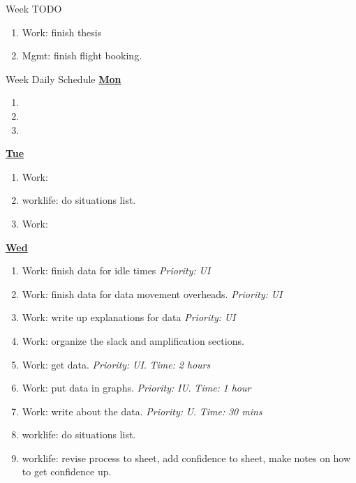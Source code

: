 \documentclass[serif, mathserif, final]{beamer}
\newcommand{\timeEst}[1]{\textit{Time:} \textit{#1}}
\newcommand{\priority}[1]{\textit{Priority:} \textit{#1}}
\begin{document}
\begin{frame}{}
\begin{columns}
\begin{column}{0.50\linewidth}
  
  \begin{block}{Week TODO} 
    \begin{enumerate} 
    \item Work: finish thesis 
    \item Mgmt: finish flight booking. 
    \end{enumerate}
  \end{block} 
  
  
\begin{block}{Week Daily Schedule} 
  \textbf{\small \underline{Mon}}
  \begin{enumerate} 
    \tiny \item \tiny 
  \item \tiny 
  \item \tiny 
  \end{enumerate} 



  \textbf{\small \underline{Tue}}
  \begin{enumerate}
  \item \tiny Work: 
  \item \tiny worklife: do situations list. 
  \item \tiny Work: 
  \end{enumerate} 
  
  \textbf{\small {\underline{Wed}}}
  \begin{enumerate} 
    \tiny \item \tiny Work: finish data for idle times \priority{UI} 
  \item \tiny Work: finish data for data movement overheads. \priority{UI} 
  \item \tiny Work: write up explanations for data \priority{UI} 
  \item \tiny Work: organize the slack and amplification sections. 
    \tiny \item \tiny Work: get data. \priority{UI}. \timeEst{2 hours} 
  \item \tiny Work: put data in graphs. \priority{IU}. \timeEst{1 hour}
  \item \tiny Work: write about the data. \priority{U}. \timeEst{30 mins} 
  \item \tiny worklife: do situations list. 
  \item \tiny worklife: revise process to sheet, add confidence to sheet, make notes on how to get confidence up. 
  \end{enumerate} 
  

\end{block}
\end{column}
\end{columns}
\end{frame}
\end{document}

